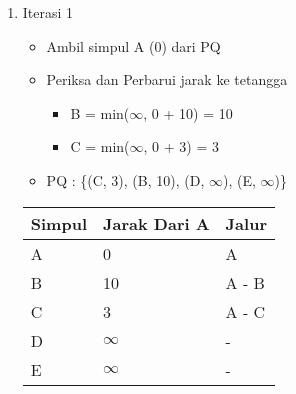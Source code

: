 \begin{enumerate}
    \item Iterasi 1
    \begin{itemize}
        \item Ambil simpul A (0) dari PQ
        \item Periksa dan Perbarui jarak ke tetangga
        \begin{itemize}
            \item B = min($\infty$, 0 + 10) = 10
            \item C = min($\infty$, 0 + 3) = 3
        \end{itemize}
        \item PQ : \{(C, 3), (B, 10), (D, $\infty$), (E, $\infty$)\}
    \end{itemize}
    \begin{table}[h]
        \begin{tabular}{|l|l|l|}
        \hline
            \textbf{Simpul} & \textbf{Jarak Dari A} & \textbf{Jalur} \\ \hline
            A               & 0                     & A     \\ \hline
            B               & 10                    & A - B     \\ \hline
            C               & 3                     & A - C     \\ \hline
            D               & $\infty$              & -     \\ \hline
            E               & $\infty$              & -     \\ \hline
        \end{tabular}
    \end{table}


\end{enumerate}
